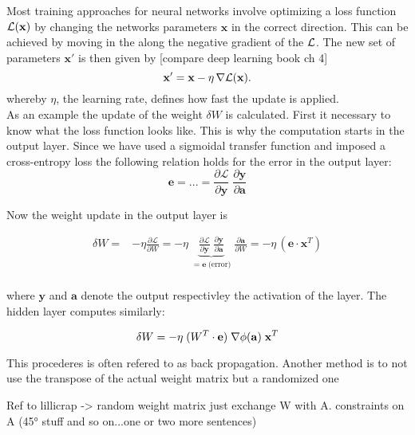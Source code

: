 Most training approaches for neural networks involve optimizing a loss function $\mathcal{L}(\mathbf{x})$ by changing the networks parameters $\mathbf{x}$ in the correct direction. This can be achieved by moving in the along the negative gradient of the $\mathcal{L}$. The new set of parameters $\mathbf{x'}$ is then given by [compare deep learning book ch 4]
\begin{equation}
\mathbf{x'} = \mathbf{x} - \eta \, \nabla\mathcal{L}(\mathbf{x}).
\end{equation}
whereby $\eta$, the learning rate, defines how fast the update is applied.\\

As an example the update of the weight $\delta W$ is calculated. First it necessary to know what the loss function looks like. This is why the computation starts in the output layer. Since we have used a sigmoidal transfer function and imposed a cross-entropy loss the following relation holds for the error in the output layer:
\begin{equation}
\mathbf{e} = ... = \frac{\partial\mathcal{L}}{\partial \mathbf{y}} \;	\frac{\partial \mathbf{y}}{\partial \mathbf{a} }
\end{equation}

Now the weight update in the output layer is

\begin{align}
\delta W =& - \eta \frac{\partial \mathcal{L}}{\partial W} 
= - \eta \;
\underbrace{\frac{\partial\mathcal{L}}{\partial \mathbf{y}} \;
	\frac{\partial \mathbf{y}}{\partial \mathbf{a} }}_{=\mathbf{e}\; \text{(error)}} \;
\frac{\partial \mathbf{a}}{\partial W}
= - \eta \, (\mathbf{e} \cdot \mathbf{x}^T)\\
\end{align}

where $\mathbf{y}$ and $\mathbf{a}$ denote the output respectivley the activation of the layer. The hidden layer computes similarly:

\begin{equation}
\delta W = - \eta \;
(W^T \cdot \mathbf{e}) \;
\nabla \phi(\mathbf{a}) \;
\mathbf{x}^T\\
\end{equation}

This procederes is often refered to as back propagation. Another method is to not use the transpose of the actual weight matrix but a randomized one 

Ref to lillicrap -> random weight matrix just exchange W with A. constraints on A (45° stuff and so on...one or two more sentences)

